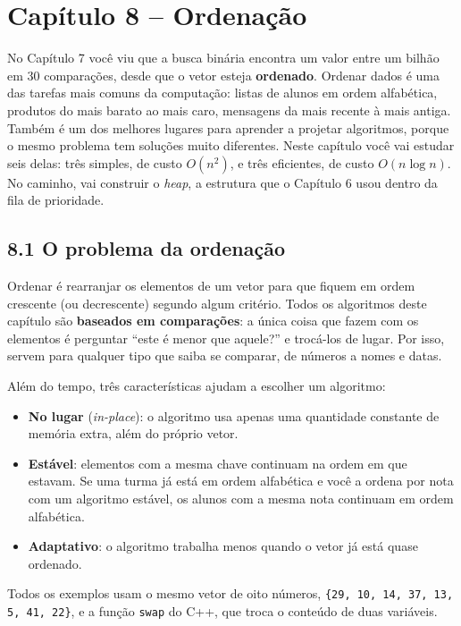 \section{Capítulo 8 -- Ordenação}

No Capítulo 7 você viu que a busca binária encontra um valor entre um bilhão em 30 comparações, desde que o vetor esteja \textbf{ordenado}. Ordenar dados é uma das tarefas mais comuns da computação: listas de alunos em ordem alfabética, produtos do mais barato ao mais caro, mensagens da mais recente à mais antiga. Também é um dos melhores lugares para aprender a projetar algoritmos, porque o mesmo problema tem soluções muito diferentes. Neste capítulo você vai estudar seis delas: três simples, de custo $O(n^2)$, e três eficientes, de custo $O(n \log n)$. No caminho, vai construir o \textit{heap}, a estrutura que o Capítulo 6 usou dentro da fila de prioridade.

\subsection{8.1 O problema da ordenação}

Ordenar é rearranjar os elementos de um vetor para que fiquem em ordem crescente (ou decrescente) segundo algum critério. Todos os algoritmos deste capítulo são \textbf{baseados em comparações}: a única coisa que fazem com os elementos é perguntar ``este é menor que aquele?'' e trocá-los de lugar. Por isso, servem para qualquer tipo que saiba se comparar, de números a nomes e datas.

Além do tempo, três características ajudam a escolher um algoritmo:

\begin{itemize}
  \item \textbf{No lugar} (\textit{in-place}): o algoritmo usa apenas uma quantidade constante de memória extra, além do próprio vetor.
  \item \textbf{Estável}: elementos com a mesma chave continuam na ordem em que estavam. Se uma turma já está em ordem alfabética e você a ordena por nota com um algoritmo estável, os alunos com a mesma nota continuam em ordem alfabética.
  \item \textbf{Adaptativo}: o algoritmo trabalha menos quando o vetor já está quase ordenado.
\end{itemize}

Todos os exemplos usam o mesmo vetor de oito números, \texttt{\{29, 10, 14, 37, 13, 5, 41, 22\}}, e a função \texttt{swap} do C++, que troca o conteúdo de duas variáveis.

